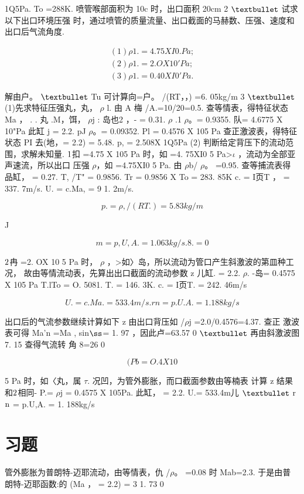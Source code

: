 1Q5Pa. To =288K. 喷管喉部面积为 10c 时，出口面积 20cm 2 ${\rm •}$ 试求以下出口环境压强 时，通过喷管的质量流量、出口截面的马赫数、压强、速度和出口后气流角度.

\begin{gather*}
(1 )\rho  1.=4.75XI0.Pa;\\
(2)\rho 1.=2. OX 10'Pa;\\
(3)\rho 1.=0.40XI0'Pa.
\end{gather*}

解由户。 ${\rm •}$ Tu 可计算向=户。 /(RT，，) =6. 05kg/m 3 ${\rm •}$ (1)先求特征压强丸，丸， $\rho$ l. 由 A 梅 /A.=10/20=0.5. 查等情表，得特征状态 Ma ， . . 丸 .M，饵， $\rho$j : 岛也2 ，- = 0.31. $\rho$ .1 $\rho$。= 0.9355. 队= 4.6775 X 10"Pa 此缸 j = 2.2. pJ $\rho$。= 0.09352. Pl = 0.4576 X 105 Pa 查正激波表，得特征状态 PI 去(地，= 2.2) = 5.48. p, = 2.508X 1Q5Pa (2) 判断给定背压下的流动范围，求解未知量. ${\rm 1}$扣 =4.75 X 105 Pa 时，如 =4. 75XI0 5 Pa>$\iota$ ，流动为全部亚声速流，所以出口 压强 $\rho$，如 =4.75XI0 5 Pa. 由 $\rho$b/ $\rho$。 =0.95. 查等捕流表得 品缸， = 0.27. T, /T" = 0.9856. Tr = 0.9856 X To = 283. 85K c. = I页T ， = 337. 7m/s. U. = c.Ma, = 9 1. 2m/s.

\[p. = \rho ,  /(RT.) = 5. 83kg/m\]

J

\[m = p,U,A. = 1. 063kg/s. 8. = 0\]

${\rm 2}$冉 =2. OX 10 5 Pa 时， $\rho$ ，>如〉岛，所以流动为管口产生斜激波的第皿种工况， 故由等情流动表，先算出出口截面的流动参数 z 儿缸. = 2.2. $\rho$. -岛= 0.4575 X 105 Pa T.lTo = O. 5081. T. = 146. 3K. c. = I页T. = 242. 46m/s

\[U. = c.Ma. = 533. 4m/s. rn = p.U.A. = 1. 188kg/s\]

出口后的气流参数继续计算如下 z 由出口背压如 /$\rho$j =2.0/0.4576=4.37. 查正 激波表可得 Ma'n =Ma , sin${\rm ß}$= 1. 97 ，因此卢=63.57 0 ${\rm •}$ 再由斜激波图 7. 15 查得气流转 角 8=26 0

\[( Pb=O. 4X 10\]

5 Pa 时，如〈丸，属 $\tau$. 况凹，为管外膨胀，而口截面参数由等楠表 计算 z 结果和${\rm 2}$相同- P.= $\rho$j = 0.4575 X 105Pa. 此缸， = 2.2. U.= 533.4m儿 ${\rm •}$ r${\rm n}$ = p.U,A. = 1. 188kg/s

\section*{习题}

管外膨胀为普朗特-迈耶流动，由等情表，仇 /$\rho$。 =0.08 时 Mab=2.3. 于是由普 朗特-迈耶函数:的 (Ma ， = 2.2) = 3 1. 73 0

